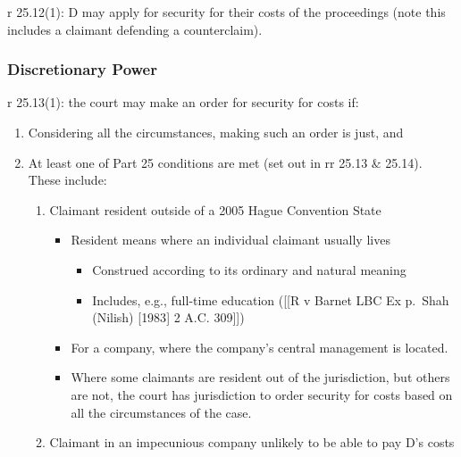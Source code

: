 \documentclass[
]{article}
\providecommand{\tightlist}{%
  \setlength{\itemsep}{0pt}\setlength{\parskip}{0pt}}
\begin{document}
r 25.12(1): D may apply for security for their costs of the proceedings
(note this includes a claimant defending a counterclaim).

\hypertarget{discretionary-power}{%
\subsubsection{Discretionary Power}\label{discretionary-power}}

r 25.13(1): the court may make an order for security for costs if:

\begin{enumerate}
\def\labelenumi{\arabic{enumi}.}
\tightlist
\item
  Considering all the circumstances, making such an order is just, and
\item
  At least one of Part 25 conditions are met (set out in rr 25.13 \&
  25.14). These include:

  \begin{enumerate}
  \def\labelenumii{\arabic{enumii}.}
  \tightlist
  \item
    Claimant resident outside of a 2005 Hague Convention State

    \begin{itemize}
    \tightlist
    \item
      Resident means where an individual claimant usually lives

      \begin{itemize}
      \tightlist
      \item
        Construed according to its ordinary and natural meaning
      \item
        Includes, e.g., full-time education ({[}{[}R v Barnet LBC Ex
        p.~Shah (Nilish) {[}1983{]} 2 A.C. 309{]}{]})
      \end{itemize}
    \item
      For a company, where the company's central management is located.
    \item
      Where some claimants are resident out of the jurisdiction, but
      others are not, the court has jurisdiction to order security for
      costs based on all the circumstances of the case.
    \end{itemize}
  \item
    Claimant in an impecunious company unlikely to be able to pay D's
    costs


\end{enumerate}
\end{enumerate}
\end{document}
